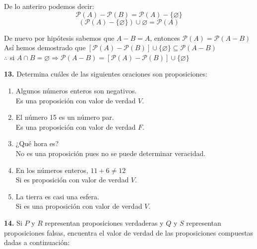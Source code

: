 \documentclass[12pt]{article}
\begin{document}
\begin{enumerate}[label=\alph*)]
    De lo anteriro podemos decir:
    \[\mathcal{P}(A) - \mathcal{P}(B) = \mathcal{P}(A) - \{\varnothing\}\]
    \[(\mathcal{P}(A) - \{\varnothing\}) \cup {\varnothing} = \mathcal{P}(A)\]

    De nuevo por hipótesis sabemos que $A - B = A$, entonces $\mathcal{P}(A) = \mathcal{P}(A - B)$\\

    Así hemos demostrado que $[\mathcal{P}(A) - \mathcal{P}(B)] \cup \{\varnothing\} \subseteq \mathcal{P}(A - B)$\\

    $\therefore$ si $A \cap B = \varnothing \Longrightarrow \mathcal{P}(A - B) = [\mathcal{P}(A) - \mathcal{P}(B)] \cup \{\varnothing\}$

\end{enumerate}

%
%
\textbf{13.} Determina cuáles de las siguientes oraciones son proposiciones:

\begin{enumerate}[label=\alph*)]
    \item Algunos números enteros son negativos.\\
    Es una proposición con valor de verdad $V$.
    \item El número 15 es un número par.\\
    Es una proposición con valor de verdad $F$.
    \item ¿Qué hora es?\\
    No es una proposición pues no se puede determinar veracidad.
    \item En los números enteros, $11 + 6 \neq 12$\\
    Si es proposición con valor de verdad $V$.
    \item La tierra es casi una esfera.\\
    Si es una proposición con valor de verdad $V$.
\end{enumerate}

%
%
\textbf{14.} Si $P$ y $R$ representan proposiciones verdaderas y $Q$ y $S$ representan proposiciones falsas,
encuentra el valor de verdad de las proposiciones compuestas dadas a continuación:
\end{document}

